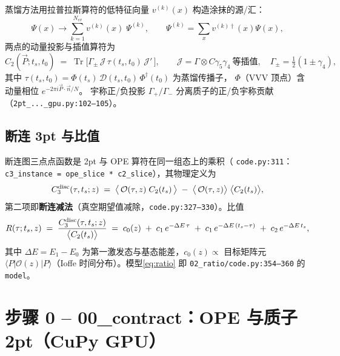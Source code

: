 \documentclass[UTF8,11pt]{ctexart}
\begin{document}
蒸馏方法用拉普拉斯算符的低特征向量 $v^{(k)}(x)$ 构造涂抹的源/汇：
\begin{equation}
  \label{eq:distill}
  \Psi(x) \to \sum_{k=1}^{N_{ev}} v^{(k)}(x)\; \Psi^{(k)},
  \qquad
  \Psi^{(k)} = \sum_x v^{(k)\dagger}(x)\Psi(x),
\end{equation}
两点的动量投影与插值算符为
\begin{equation}
  \label{eq:2pt}
  C_2(\vec P; t_s, t_0)
  \;=\; \operatorname{Tr}\!\big[
  \Gamma_{\pm}\,\mathcal{J}\,\tau(t_s,t_0)\,\mathcal{J}'\,\big],
  \qquad
  \mathcal J = \Gamma\otimes C\gamma_5\gamma_4\ \text{等插值},
  \quad \Gamma_\pm = \tfrac12(1\pm \gamma_4),
\end{equation}
其中 $\tau(t_s,t_0)=\Phi(t_s)\,\mathcal{D}(t_s,t_0)\,\Phi^\dagger(t_0)$ 为蒸馏传播子，
$\Phi$（VVV 顶点）含动量相位 $e^{-2\pi i \vec P\cdot\vec n/N}$。
宇称正/负投影 $\Gamma_+/\Gamma_-$ 分离质子的正/负宇称贡献（\texttt{2pt\_...\_gpu.py:102--105}）。

\subsection{断连 3pt 与比值}
\label{sec:ratio_def}

断连图三点点函数是 2pt 与 OPE 算符在同一组态上的乘积（
\texttt{code.py:311}：\texttt{c3\_instance = ope\_slice * c2\_slice}），其物理定义为
\begin{equation}
  \label{eq:disc3pt}
  C_3^{\rm disc}(\tau, t_s; z)
  \;=\;\big\langle\,\mathcal{O}(\tau,z)\; C_2(t_s)\,\big\rangle
  \;-\;\big\langle\,\mathcal{O}(\tau,z)\big\rangle\;
  \big\langle C_2(t_s)\big\rangle ,
\end{equation}
第二项即\textbf{断连减法}（真空期望值减除，\texttt{code.py:327--330}）。比值
\begin{equation}
  \label{eq:ratio}
  R(\tau; t_s, z)
  \;=\; \frac{C_3^{\rm disc}(\tau, t_s; z)}{\big\langle C_2(t_s)\big\rangle}
  \;=\; c_0(z)\;+\; c_1\,e^{-\Delta E\,\tau}
  \;+\; c_1\,e^{-\Delta E\,(t_s-\tau)}\;+\;c_2\,e^{-\Delta E\,t_s},
\end{equation}
其中 $\Delta E=E_1-E_0$ 为第一激发态与基态能差，$c_0(z)\propto$ 目标矩阵元
$\langle P| \mathcal{O}(z)|P\rangle$（Ioffe 时间分布）。模型\eqref{eq:ratio}
即 \texttt{02\_ratio/code.py:354--360} 的 \texttt{model}。

\section{步骤 0 -- 00\_contract：OPE 与质子 2pt（CuPy GPU）}
\label{sec:step0}
\end{document}
